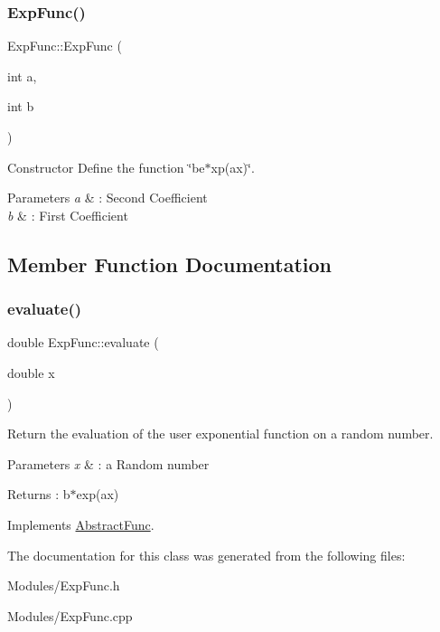 \subsubsection{\texorpdfstring{Exp\+Func()}{ExpFunc()}}
{\footnotesize\ttfamily Exp\+Func\+::\+Exp\+Func (\begin{DoxyParamCaption}\item[{int}]{a,  }\item[{int}]{b }\end{DoxyParamCaption})\hspace{0.3cm}{\ttfamily [inline]}}



Constructor Define the function \char`\"{}be$\ast$xp(ax)\char`\"{}. 


\begin{DoxyParams}{Parameters}
{\em a} & \+: Second Coefficient \\
\hline
{\em b} & \+: First Coefficient \\
\hline
\end{DoxyParams}


\subsection{Member Function Documentation}
\mbox{\label{classExpFunc_a338e91308f12a66e3d1989ed5f589626}} 
\subsubsection{\texorpdfstring{evaluate()}{evaluate()}}
{\footnotesize\ttfamily double Exp\+Func\+::evaluate (\begin{DoxyParamCaption}\item[{double}]{x }\end{DoxyParamCaption})\hspace{0.3cm}{\ttfamily [virtual]}}



Return the evaluation of the user exponential function on a random number. 


\begin{DoxyParams}{Parameters}
{\em x} & \+: a Random number \\
\hline
\end{DoxyParams}
\begin{DoxyReturn}{Returns}
\+: b$\ast$exp(ax) 
\end{DoxyReturn}


Implements \hyperlink{classAbstractFunc_ac98be1daa5131b9fddcfdba0a2c34871}{Abstract\+Func}.



The documentation for this class was generated from the following files\+:\begin{DoxyCompactItemize}
\item 
Modules/Exp\+Func.\+h\item 
Modules/Exp\+Func.\+cpp\end{DoxyCompactItemize}

